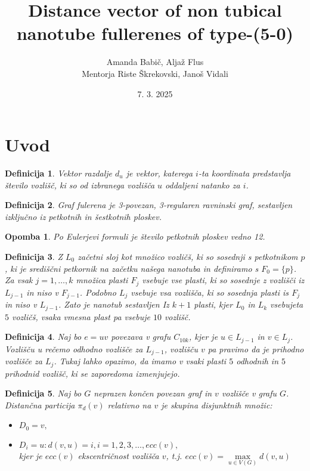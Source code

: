 \documentclass[a4paper, 12pt]{article}
\title{
    Distance vector of non tubical nanotube fullerenes of type-(5-0)
}
\author{Amanda Babič, Aljaž Flus \\
        {\small Mentorja Riste Škrekovski, Janoš Vidali}}
\date{7. 3. 2025}
\newtheorem{definicija}{Definicija}[section]
\newtheorem{opomba}{Opomba}[section]
\begin{document}
\maketitle

\newpage

\section{Uvod}

\begin{definicija}
    Vektor razdalje $d_{u}$ je vektor, katerega $i$-ta koordinata predstavlja število vozlišč, ki so od izbranega vozlišča $u$ oddaljeni natanko za $i$. 
\end{definicija}

\begin{definicija}
    Graf fulerena je 3-povezan, 3-regularen ravninski graf, sestavljen izključno iz petkotnih in šestkotnih ploskev.
\end{definicija}

\begin{opomba}
    Po Eulerjevi formuli je število petkotnih ploskev vedno 12.
\end{opomba}

\begin{definicija}
    Z $L_{0}$ začetni sloj kot množico vozličš, ki so sosednji s petkotnikom $p$, ki je središčni petkornik na začetku našega nanotuba 
    in definiramo s $F_0 = \{p\}$. Za vsak $j = 1, \dots , k$ množica plasti $F_j$ vsebuje vse plasti, ki so sosednje z vozlišči iz $L_{j-1}$ 
    in niso v $F_{j-1}$. Podobno $L_j$ vsebuje vsa vozlišča, ki so sosednja plasti is $F_j$ in niso v $L_{j-1}$. Zato je nanotub sestavljen Iz 
    $k+1$ plasti, kjer $L_0$ in $L_{k}$ vsebujeta $5$ vozličš, vsaka vmesna plast pa vsebuje $10$ vozlišč.
\end{definicija}

\begin{definicija}
    Naj bo $e = uv$ povezava v grafu $C_{10k}$, kjer je $u \in L_{j-1}$ in $v \in L_j$. Vozlišču u rečemo odhodno vozlišče za $L_{j-1}$, 
    vozlišču $v$ pa pravimo da je prihodno vozlišče za $L_j$. Tukaj lahko opazimo, da imamo v vsaki plasti $5$ odhodnih in $5$ prihodnid vozlišč,
    ki se zaporedoma izmenjujejo.
\end{definicija}

\begin{definicija}
    Naj bo $G$ neprazen končen povezan graf in $v$ vozlišče v grafu $G$. Distančna particija $\pi_{d}(v)$ 
    relativno na $v$ je skupina disjunktnih množic:
    \begin{itemize}
        \item $D_{0} = {v},$
        \item $D_{i} = {u : d(v,u) = i}, i= 1,2,3, \dots , ecc(v),$ \\
        kjer je $ecc(v)$ ekscentričnost vozlišča $v$, t.j. $ecc(v) = \max\limits_{u \in V(G)} d(v,u)$

    \end{itemize}
\end{definicija}
\end{document}
